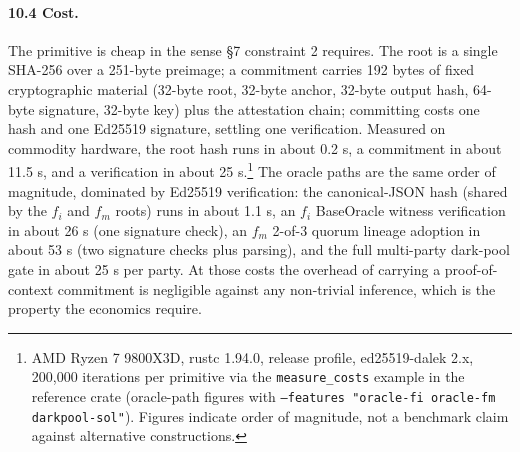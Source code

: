 \documentclass[11pt]{article}
\begin{document}
\paragraph{10.4 Cost.} The primitive is cheap in the sense \S7 constraint 2 requires. The root is a single SHA-256 over a 251-byte preimage; a commitment carries 192 bytes of fixed cryptographic material (32-byte root, 32-byte anchor, 32-byte output hash, 64-byte signature, 32-byte key) plus the attestation chain; committing costs one hash and one Ed25519 signature, settling one verification. Measured on commodity hardware, the root hash runs in about 0.2 \textmu{}s, a commitment in about 11.5 \textmu{}s, and a verification in about 25 \textmu{}s.\footnote{AMD Ryzen 7 9800X3D, rustc 1.94.0, release profile, ed25519-dalek 2.x, 200,000 iterations per primitive via the \texttt{measure\_costs} example in the reference crate (oracle-path figures with \texttt{--features "oracle-fi oracle-fm darkpool-sol"}). Figures indicate order of magnitude, not a benchmark claim against alternative constructions.} The oracle paths are the same order of magnitude, dominated by Ed25519 verification: the canonical-JSON hash (shared by the $f_i$ and $f_m$ roots) runs in about 1.1 \textmu{}s, an $f_i$ BaseOracle witness verification in about 26 \textmu{}s (one signature check), an $f_m$ 2-of-3 quorum lineage adoption in about 53 \textmu{}s (two signature checks plus parsing), and the full multi-party dark-pool gate in about 25 \textmu{}s per party. At those costs the overhead of carrying a proof-of-context commitment is negligible against any non-trivial inference, which is the property the economics require.
\end{document}
